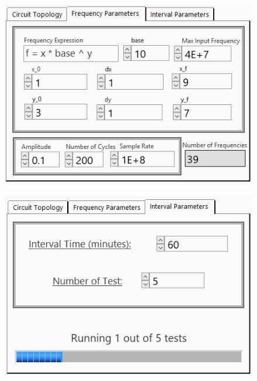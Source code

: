 \begin{figure}[h]
\centering
\begin{minipage}[t]{.48\textwidth}
  \centering
  \includegraphics[width=\textwidth]{images/labview_freq.png}
  \label{fig:labview_frequency_settings}
\end{minipage}
\vspace{0.2 in}
\vfill
\begin{minipage}[t]{.48\textwidth}
  \centering
  \includegraphics[width=\textwidth]{images/labview_intervals.png}
  \label{fig:labview_interval_settings}
\end{minipage}
\end{figure}

